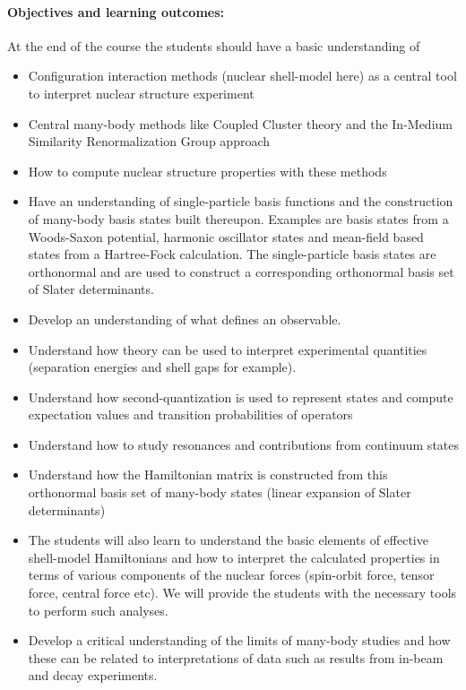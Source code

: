 \documentclass[%
oneside,                 %
final,                   %
10pt]{article}
\begin{document}
\paragraph{Objectives and learning outcomes:}
At the end of the course the students should have a basic understanding of
\begin{itemize}
\item Configuration interaction methods (nuclear shell-model here) as a central tool to interpret nuclear structure experiment

\item Central many-body methods like Coupled Cluster theory and the In-Medium Similarity Renormalization Group approach

\item How to compute nuclear structure properties with these methods 

\item Have an understanding of single-particle basis functions and the construction of many-body basis states built thereupon. Examples are basis states from a Woods-Saxon potential, harmonic oscillator states and mean-field based states from a Hartree-Fock calculation. The single-particle basis states are orthonormal and are used to construct  a corresponding orthonormal basis set of Slater determinants.

\item Develop an understanding of what defines an observable. 

\item Understand how theory  can be used to interpret experimental quantities (separation energies and shell gaps for example).

\item Understand how second-quantization is used to represent states and compute expectation values and transition probabilities  of operators

\item Understand how to study resonances and contributions from continuum states

\item Understand how the Hamiltonian matrix is constructed from this orthonormal basis set of many-body states (linear expansion of Slater determinants)

\item The students will also learn to understand the basic elements of effective shell-model Hamiltonians and how to interpret the calculated properties in terms of various components of the nuclear forces (spin-orbit force, tensor force, central force etc). We will provide the students with the necessary tools to perform such analyses. 

\item Develop a critical understanding of the limits of many-body studies and how these can be related to interpretations of data such as results from in-beam and decay experiments.
\end{itemize}
\end{document}
